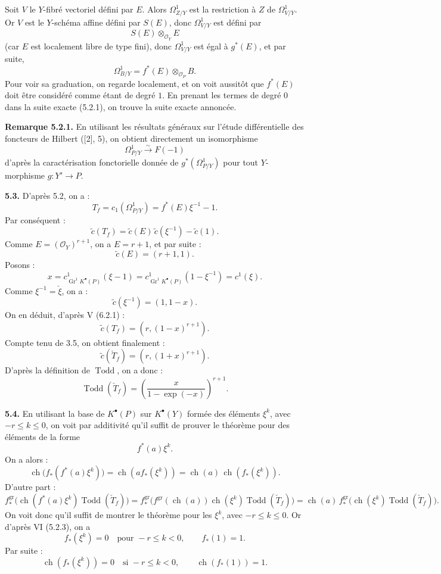 \documentclass[11pt]{article}
\newcommand{\Gr}{\operatorname{Gr}}
\newcommand{\ch}{\operatorname{ch}}
\newcommand{\Todd}{\operatorname{Todd}}
\providecommand{\ch}{\operatorname{ch}}
\providecommand{\Todd}{\operatorname{Todd}}
\providecommand{\Gr}{\operatorname{Gr}}
\providecommand{\Gr}{\operatorname{G}}
\begin{document}
Soit \(V\) le \(Y\)-fibré vectoriel défini par \(E\). Alors \(\Omega^1_{Z/Y}\) est la restriction à \(Z\) de \(\Omega^1_{V/Y}\). Or \(V\) est le \(Y\)-schéma affine défini par \(S(E)\), donc \(\Omega^1_{V/Y}\) est défini par
\[
S(E)\otimes_{\mathcal O_Y}E
\]
(car \(E\) est localement libre de type fini), donc \(\Omega^1_{V/Y}\) est égal à \(g^*(E)\), et par suite,
\[
\Omega^1_{B/Y}=f^*(E)\otimes_{\mathcal O_P}B.
\]
Pour voir sa graduation, on regarde localement, et on voit aussitôt que \(f^*(E)\) doit être considéré comme étant de degré \(1\). En prenant les termes de degré \(0\) dans la suite exacte (5.2.1), on trouve la suite exacte annoncée.

\textbf{Remarque 5.2.1.} En utilisant les résultats généraux sur l'étude différentielle des foncteurs de Hilbert ([2], 5), on obtient directement un isomorphisme
\[
\Omega^1_{P/Y}\xrightarrow{\sim}F(-1)
\]
d'après la caractérisation fonctorielle donnée de \(g^*(\Omega^1_{P/Y})\) pour tout \(Y\)-morphisme \(g:Y'\to P\).

\textbf{5.3.} D'après 5.2, on a :
\[
 T_f=c_1(\Omega^1_{P/Y})=f^*(E)\xi^{-1}-1.
\]
Par conséquent :
\[
 \widetilde c(T_f)=\widetilde c(E)\,\widetilde c(\xi^{-1})-\widetilde c(1).
\]
Comme \(E=(\mathcal O_Y)^{r+1}\), on a \(E=r+1\), et par suite :
\[
 \widetilde c(E)=(r+1,1).
\]
Posons :
\[
 x=c^1_{\Gr^1K^{\bullet}(P)}(\xi-1)
 =
 c^1_{\Gr^1K^{\bullet}(P)}(1-\xi^{-1})
 =
 c^1(\xi).
\]
Comme \(\xi^{-1}=\check \xi\), on a :
\[
 \widetilde c(\xi^{-1})=(1,1-x).
\]
On en déduit, d'après V (6.2.1) :
\[
 \widetilde c(T_f)=(r,(1-x)^{r+1}).
\]
Compte tenu de 3.5, on obtient finalement :
\[
 \widetilde c(\check T_f)=(r,(1+x)^{r+1}).
\]
D'après la définition de \(\Todd\), on a donc :
\begin{equation}\tag{5.3.1}
 \Todd(\check T_f)=
 \left(\frac{x}{1-\exp(-x)}\right)^{r+1}.
\end{equation}

\textbf{5.4.} En utilisant la base de \(K^{\bullet}(P)\) sur \(K^{\bullet}(Y)\) formée des éléments \(\xi^k\), avec \(-r\leq k\leq0\), on voit par additivité qu'il suffit de prouver le théorème pour des éléments de la forme
\[
 f^*(a)\xi^k.
\]
On a alors :
\[
 \ch\bigl(f_*(f^*(a)\xi^k)\bigr)
 =
 \ch(a f_*(\xi^k))
 =
 \ch(a)\,\ch(f_*(\xi^k)).
\]
D'autre part :
\[
 f^{\mathrm{gr}}_*\bigl(\ch(f^*(a)\xi^k)\Todd(\check T_f)\bigr)
 =
 f^{\mathrm{gr}}_*\bigl(f^{\mathrm{gr}}(\ch(a))\ch(\xi^k)\Todd(\check T_f)\bigr)
 =
 \ch(a)\,f^{\mathrm{gr}}_*\bigl(\ch(\xi^k)\Todd(\check T_f)\bigr).
\]
On voit donc qu'il suffit de montrer le théorème pour les \(\xi^k\), avec \(-r\leq k\leq0\). Or d'après VI (5.2.3), on a
\[
 f_*(\xi^k)=0\quad\text{pour }-r\leq k<0,\qquad f_*(1)=1.
\]
Par suite :
\begin{equation}\tag{5.4.1}
 \ch(f_*(\xi^k))=0\quad\text{si }-r\leq k<0,\qquad
 \ch(f_*(1))=1.
\end{equation}
\end{document}
